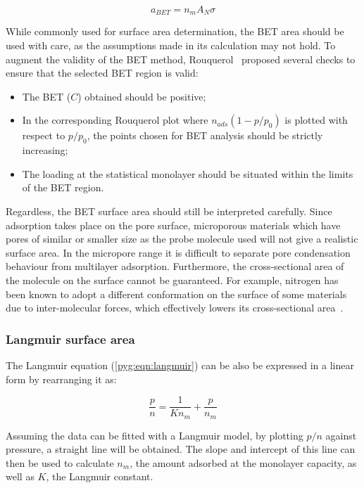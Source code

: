 \begin{equation}
	a_{BET} = n_m A_N \sigma
\end{equation}

While commonly used for surface area determination, the BET area
should be used with care, as the assumptions made in
its calculation may not hold. To augment the validity of the BET
method, Rouquerol~\cite{rouquerolAdsorptionPowdersPorous2013} proposed
several checks to ensure that the selected BET region is valid:

\begin{itemize}

	\item The BET (\(C\)) obtained should be positive;
	\item In the corresponding Rouquerol plot where \(n_{ads}(1-p/p_0)\)
	      is plotted with respect to \(p/p_0\), the points chosen for BET
	      analysis should be strictly increasing;
	\item The loading at the statistical monolayer should be
	      situated within the limits of the BET region.

\end{itemize}

Regardless, the BET surface area should still be interpreted carefully.
Since adsorption takes place on the pore surface, microporous materials
which have pores of similar or smaller size as the probe molecule used
will not give a realistic surface area. In the micropore range
it is difficult to separate pore condensation behaviour from
multilayer adsorption. Furthermore, the cross-sectional
area of the molecule on the surface cannot be guaranteed. For example,
nitrogen has been known to adopt a different conformation on the surface
of some materials due to inter-molecular forces, which effectively
lowers its cross-sectional area~\cite{rouquerolAdsorptionPowdersPorous2013}.

\subsubsection{Langmuir surface area}\label{pyg:charac:langmuirarea}

The Langmuir equation (\autoref{pyg:eqn:langmuir}) can be also
be expressed in a linear form by rearranging it as:

\begin{equation}
	\frac{p}{n} = \frac{1}{K n_m} + \frac{p}{n_m}
\end{equation}

Assuming the data can be fitted with a Langmuir model, by plotting
\({p}/{n}\) against pressure, a straight line will be obtained.
The slope and intercept of this line can then be used to calculate
\(n_{m}\), the amount adsorbed at the monolayer capacity, as well
as \(K\), the Langmuir constant.

